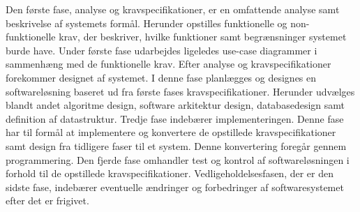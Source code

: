 \noindent
Den første fase, analyse og kravspecifikationer, er en omfattende analyse samt beskrivelse af systemets formål. Herunder opstilles funktionelle og non-funktionelle krav, der beskriver, hvilke funktioner samt begrænsninger systemet burde have. Under første fase udarbejdes ligeledes use-case diagrammer i sammenhæng med de funktionelle krav. Efter analyse og kravspecifikationer forekommer designet af systemet. I denne fase planlægges og designes en softwareløsning baseret ud fra første fases kravspecifikationer. Herunder udvælges blandt andet algoritme design, software arkitektur design, databasedesign samt definition af datastruktur. Tredje fase indebærer implementeringen. Denne fase har til formål at implementere og konvertere de opstillede kravspecifikationer samt design fra tidligere faser til et system. Denne konvertering foregår gennem programmering. Den fjerde fase omhandler test og kontrol af softwareløsningen i forhold til de opstillede kravspecifikationer. Vedligeholdelsesfasen, der er den sidste fase, indebærer eventuelle ændringer og forbedringer af softwaresystemet efter det er frigivet.\cite{Alshamrani2015,Bassil2012}








